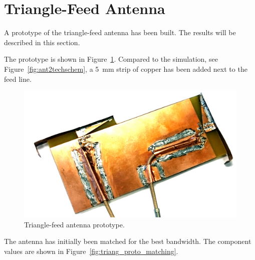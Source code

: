 \section{Triangle-Feed Antenna}

A prototype of the triangle-feed antenna has been built. The results will be described in this section.

The prototype is shown in Figure~\ref{fig:triang_proto}. Compared to the simulation, see Figure~\ref{fig:ant2techschem}, a \SI{5}{mm} strip of copper has been added next to the feed line.  

\begin{figure}[htbp]
    \centering
    \includegraphics{img/tech_sol/trianglefeed/mockup/mockup.jpg}
    \caption{Triangle-feed antenna prototype.}
    \label{fig:triang_proto}
\end{figure}

The antenna has initially been matched for the best bandwidth. The component values are shown in Figure~\ref{fig:triang_proto_matching}.

